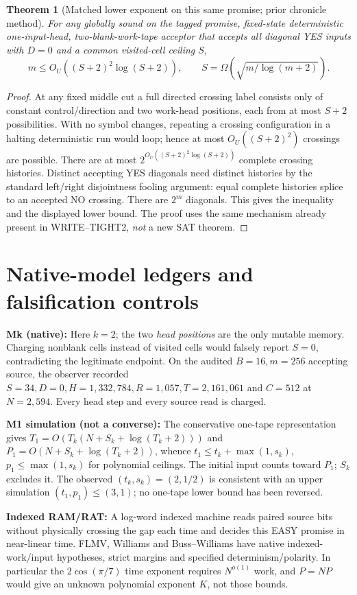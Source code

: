 \documentclass[11pt]{article}
\newtheorem{theorem}{Theorem}
\begin{document}
\begin{theorem}[Matched lower exponent on this same promise; prior chronicle method]
For any \emph{globally sound on the tagged promise}, fixed-state deterministic one-input-head, two-blank-work-tape acceptor that accepts all diagonal YES inputs with \(D=0\) and a common visited-cell ceiling \(S\),
\[
 m\le O_U((S+2)^2\log(S+2)),\qquad
 S=\Omega\!\left(\sqrt{m/\log(m+2)}\right).
\]
\end{theorem}
\begin{proof}
At any fixed middle cut a full directed crossing label consists only of constant control/direction and two work-head positions, each from at most \(S+2\) possibilities. With no symbol changes, repeating a crossing configuration in a halting deterministic run would loop; hence at most \(O_U((S+2)^2)\) crossings are possible. There are at most \(2^{O_U((S+2)^2\log(S+2))}\) complete crossing histories. Distinct accepting YES diagonals need distinct histories by the standard left/right disjointness fooling argument: equal complete histories splice to an accepted NO crossing. There are \(2^m\) diagonals. This gives the inequality and the displayed lower bound. The proof uses the same mechanism already present in WRITE--TIGHT2, \emph{not} a new SAT theorem.
\end{proof}

\section{Native-model ledgers and falsification controls}
\noindent\textbf{Mk (native):} Here \(k=2\); the two \emph{head positions} are the only mutable memory. Charging nonblank cells instead of visited cells would falsely report \(S=0\), contradicting the legitimate endpoint. On the audited \(B=16,m=256\) accepting source, the observer recorded \(S=34,D=0,H=1{,}332{,}784,R=1{,}057,T=2{,}161{,}061\) and \(C=512\) at \(N=2{,}594\). Every head step and every source read is charged.

\noindent\textbf{M1 simulation (not a converse):} The conservative one-tape representation gives \(T_1=O(T_k(N+S_k+\log(T_k+2)))\) and \(P_1=O(N+S_k+\log(T_k+2))\), whence \(t_1\le t_k+\max(1,s_k)\), \(p_1\le\max(1,s_k)\) for polynomial ceilings. The initial input counts toward \(P_1\); \(S_k\) excludes it. The observed \((t_k,s_k)=(2,1/2)\) is consistent with an upper simulation \((t_1,p_1)\le(3,1)\); no one-tape lower bound has been reversed.

\noindent\textbf{Indexed RAM/RAT:} A log-word indexed machine reads paired source bits without physically crossing the gap each time and decides this EASY promise in near-linear time. FLMV, Williams and Buss--Williams have native indexed-work/input hypotheses, strict margins and specified determinism/polarity. In particular the \(2\cos(\pi/7)\) time exponent requires \(N^{o(1)}\) work, and \(P=NP\) would give an unknown polynomial exponent \(K\), not those bounds.
\end{document}
